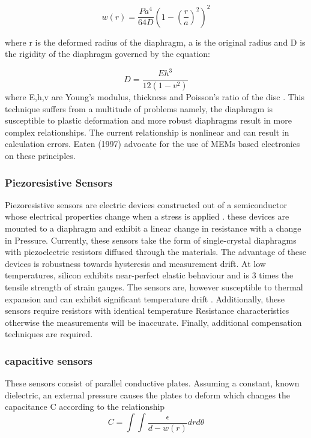 \begin{equation}
	w(r) = \frac{Pa^4}{64D}(1- (\frac{r}{a})^2)^2
\end{equation}

where r is the deformed radius of the diaphragm, a is the original radius and D is the  rigidity of the diaphragm governed by the equation:

\begin{equation}
	D = \frac{Eh^3}{12(1-v^2)}
\end{equation}
where E,h,v are Young's modulus, thickness and Poisson's ratio of the disc \cite{eaton1997micromachined}. This technique suffers from a multitude of problems namely, the diaphragm is susceptible to plastic deformation and more robust diaphragms result in more complex relationships. The current relationship is nonlinear and can result in calculation errors. Eaten (1997) advocate for the use of MEMs based electronics on these principles.
\subsubsection{Piezoresistive Sensors}

Piezoresistive sensors are electric devices constructed out of a semiconductor whose electrical properties change when a stress is applied \cite{eaton1997micromachined}. these devices are mounted to a diaphragm and exhibit a linear change in resistance with a change in Pressure. Currently, these sensors take the form of single-crystal diaphragms with piezoelectric resistors diffused through the materials. The advantage of these devices is robustness towards hysteresis and measurement drift. At low temperatures, silicon exhibits near-perfect elastic behaviour and is  3 times the tensile strength of strain gauges\cite{eaton1997micromachined}. The sensors are, however susceptible to thermal expansion and can exhibit significant temperature drift \cite{samaun1971ic}. Additionally, these sensors require resistors with identical temperature Resistance characteristics otherwise the measurements will be inaccurate. Finally, additional compensation techniques are required.

\subsubsection{capacitive sensors}

These sensors consist of parallel conductive plates. Assuming a constant, known dielectric, an external pressure causes the plates to deform which changes the capacitance C according to the relationship \cite{eaton1997micromachined}
\begin{equation}
	C = \int \int \frac{\epsilon}{d - w(r)}drd\theta
\end{equation}

